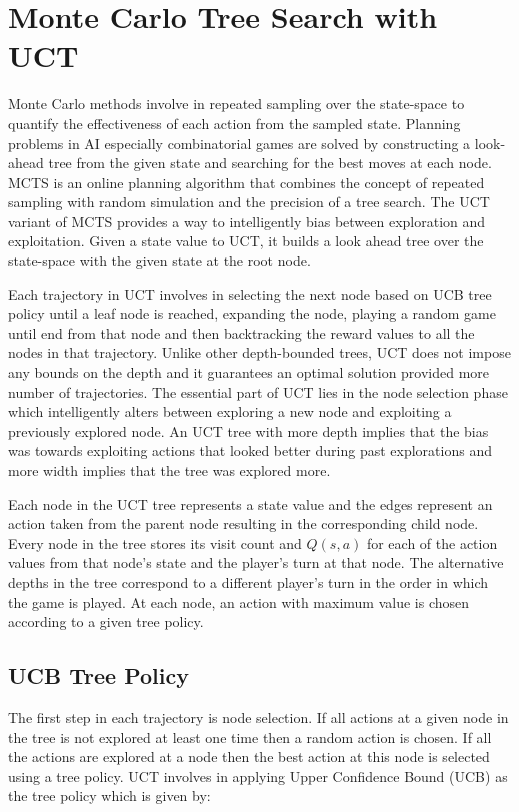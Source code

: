 \documentclass[double,12pt]{beavtex}
\begin{document}
\chapter{Monte Carlo Tree Search with UCT}
Monte Carlo methods involve in repeated sampling over the state-space to quantify the effectiveness of each action from the sampled state. Planning problems in AI especially combinatorial games are solved by constructing a look-ahead tree from the given state and searching for the best moves at each node. MCTS is an online planning algorithm that combines the concept of repeated sampling with random simulation and the precision of a tree search. The UCT variant of MCTS provides a way to intelligently bias between exploration and exploitation. Given a state value to UCT, it builds a look ahead tree over the state-space with the given state at the root node.

Each trajectory in UCT involves in selecting the next node based on UCB tree policy until a leaf node is reached, expanding the node, playing a random game until end from that node and then backtracking the reward values to all the nodes in that trajectory. Unlike other depth-bounded trees, UCT does not impose any bounds on the depth and it guarantees an optimal solution provided more number of trajectories. The essential part of UCT lies in the node selection phase which intelligently alters between exploring a new node and exploiting a previously explored node. An UCT tree with more depth implies that the bias was towards exploiting actions that looked better during past explorations and more width implies that the tree was explored more.

Each node in the UCT tree represents a state value and the edges represent an action taken from the parent node resulting in the corresponding child node. Every node in the tree stores its visit count and $Q(s,a)$ for each of the action values from that node's state and the player's turn at that node. The alternative depths in the tree correspond to a different player's turn in the order in which the game is played. At each node, an action with maximum value is chosen according to a given tree policy.

\section {UCB Tree Policy}
The first step in each trajectory is node selection. If all actions at a given node in the tree is not explored at least one time then a random action is chosen. If all the actions are explored at a node then the best action at this node is selected using a tree policy. UCT involves in applying Upper Confidence Bound (UCB) as the tree policy which is given by:
\end{document}
